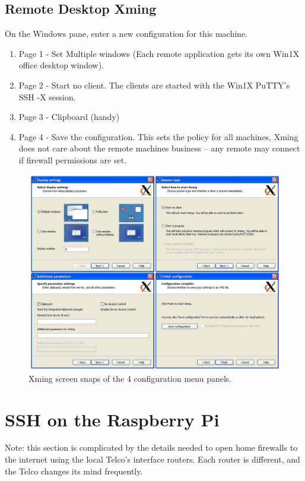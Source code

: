 \newpage
\subsection{Remote Desktop Xming}


On the Windows pane, enter a new configuration for this machine.

\vspace{-.15cm}
\begin{enumerate}\addtolength{\itemsep}{-0.5\baselineskip}
   \item Page 1 - Set Multiple windows (Each remote application gets
     its own Win1X office desktop window).
   \item Page 2 - Start no client. The clients are started with the
     Win1X PuTTY's SSH -X session.
   \item  Page 3 - Clipboard (handy)
   \item Page 4 - Save the configuration. This sets the policy for all
     machines, Xming does not care about the remote machines business
     -- any remote may connect if firewall permissions are set.
\end{enumerate}


\begin{figure}[h!]
\centering
\includegraphics[width=.75\textwidth]{images/XmingConfig.png}
\caption{Xming screen snaps of the 4 configuration menu panels.} %
\label{figure:}
\end{figure}


\newpage
\section{SSH on the Raspberry Pi}

Note: this section is complicated by the details needed to open
home firewalls to the internet using the local Telco's interface
routers. Each router is different, and the Telco changes its mind
frequently.

